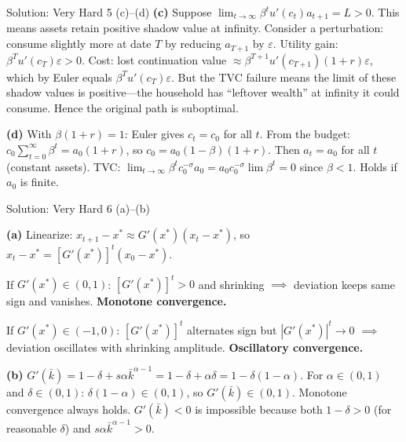 \documentclass[aspectratio=169,10pt]{beamer}
\newcommand{\backbutton}[1]{\hfill\hyperlink{#1}{\beamerbutton{Back}}}
\begin{document}
\begin{frame}{Solution: Very Hard 5 (c)--(d)}
\textbf{(c)} Suppose $\lim_{t\to\infty}\beta^t u'(c_t)a_{t+1} = L > 0$. This means assets retain positive shadow value at infinity. Consider a perturbation: consume slightly more at date $T$ by reducing $a_{T+1}$ by $\varepsilon$. Utility gain: $\beta^T u'(c_T)\varepsilon > 0$. Cost: lost continuation value $\approx \beta^{T+1}u'(c_{T+1})(1+r)\varepsilon$, which by Euler equals $\beta^T u'(c_T)\varepsilon$. But the TVC failure means the limit of these shadow values is positive---the household has ``leftover wealth'' at infinity it could consume. Hence the original path is suboptimal.

\medskip
\textbf{(d)} With $\beta(1+r)=1$: Euler gives $c_t = c_0$ for all $t$. From the budget: $c_0\sum_{t=0}^{\infty}\beta^t = a_0(1+r)$, so $c_0 = a_0(1-\beta)(1+r)$. Then $a_t = a_0$ for all $t$ (constant assets). TVC: $\lim_{t\to\infty}\beta^t c_0^{-\sigma} a_0 = a_0 c_0^{-\sigma}\lim\beta^t = 0$ since $\beta<1$. Holds if $a_0$ is finite.
\backbutton{q-v5}
\end{frame}

\begin{frame}{Solution: Very Hard 6 (a)--(b)}
\hypertarget{s-v6}{}

\textbf{(a)} Linearize: $x_{t+1}-x^* \approx G'(x^*)(x_t-x^*)$, so $x_t-x^* = [G'(x^*)]^t(x_0-x^*)$.

If $G'(x^*)\in(0,1)$: $[G'(x^*)]^t > 0$ and shrinking $\implies$ deviation keeps same sign and vanishes. \textbf{Monotone convergence.}

If $G'(x^*)\in(-1,0)$: $[G'(x^*)]^t$ alternates sign but $|G'(x^*)|^t\to 0$ $\implies$ deviation oscillates with shrinking amplitude. \textbf{Oscillatory convergence.}

\medskip
\textbf{(b)} $G'(\bar{k}) = 1-\delta+s\alpha\bar{k}^{\alpha-1} = 1-\delta+\alpha\delta = 1-\delta(1-\alpha)$. For $\alpha\in(0,1)$ and $\delta\in(0,1)$: $\delta(1-\alpha)\in(0,1)$, so $G'(\bar{k})\in(0,1)$. Monotone convergence always holds. $G'(\bar{k})<0$ is impossible because both $1-\delta>0$ (for reasonable $\delta$) and $s\alpha\bar{k}^{\alpha-1}>0$.
\end{frame}
\end{document}

